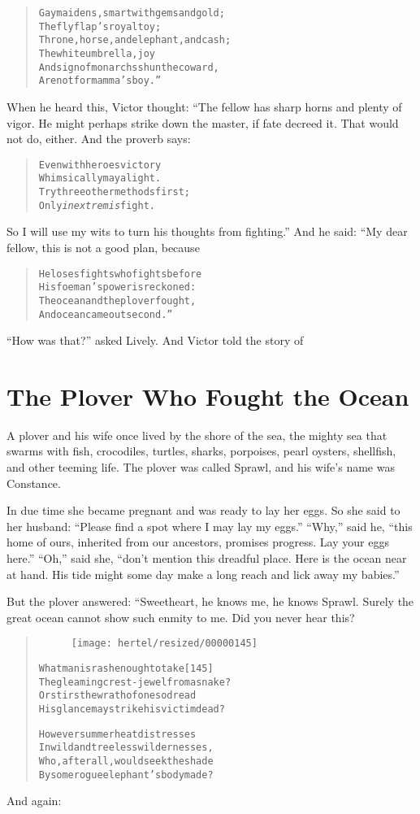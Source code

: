 \documentclass[article, twoside, 10pt]{memoir}
\renewenvironment{verbatim}{%
\begin{quote}%
\vskip -10pt%
\begin{alltt}\normalfont\small}{\end{alltt}%
\end{quote}%
\vskip -10pt
} %
\begin{document}
\begin{verbatim}
Gay maidens, smart with gems and gold;
    The flyflap's royal toy;
Throne, horse, and elephant, and cash;
    The white umbrella, joy
And sign of monarchs{\textemdash}shun the coward,
    Are not for mamma's boy.”
\end{verbatim}
When he heard this, Victor thought: “The fellow has sharp horns and
plenty of vigor. He might perhaps strike down the master, if fate
decreed it. That would not do, either. And the proverb says:

\begin{verbatim}
Even with heroes victory
    Whimsically may alight.
Try three other methods first;
    Only \emph{in extremis} fight.
\end{verbatim}
So I will use my wits to turn his thoughts from fighting.” And he
said: “My dear fellow, this is not a good plan, because

\begin{verbatim}
He loses fights who fights before
    His foeman's power is reckoned:
The ocean and the plover fought,
    And ocean came out second.”
\end{verbatim}
``How was that?'' asked Lively. And Victor told the story of

\chapter{The Plover Who Fought the Ocean}

A plover and his wife once lived by the shore of the sea, the
mighty sea that swarms with fish, crocodiles, turtles, sharks,
porpoises, pearl oysters, shellfish, and other teeming life. The
plover was called Sprawl, and his wife's name was Constance.

In due time she became pregnant and was ready to lay her eggs. So
she said to her husband:
``Please find a spot where I may lay my eggs.'' ``Why,'' said he,
``this home of ours, inherited from our ancestors, promises progress. Lay your eggs here.''
``Oh,'' said she,
``don't mention this dreadful place. Here is the ocean near at hand. His tide might some day make a long reach and lick away my babies.''

But the plover answered: “Sweetheart, he knows me, he knows Sprawl.
Surely the great ocean cannot show such enmity to me. Did you never
hear this?

\begin{verbatim}
\begin{figure}[p]\texttt{[image: hertel/resized/00000145]}\end{figure}What man is rash enough to take                         [145]
The gleaming crest-jewel from a snake?
Or stirs the wrath of one so dread
His glance may strike his victim dead?

However summer heat distresses
In wild and treeless wildernesses,
Who, after all, would seek the shade
By some rogue elephant's body made?
\end{verbatim}
And again:
\end{document}
